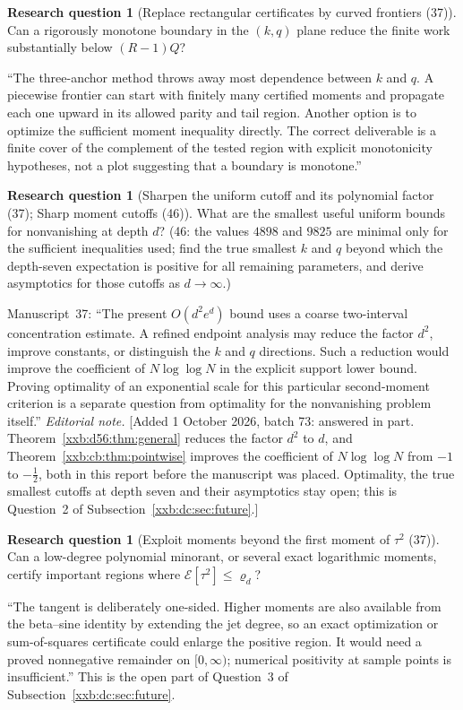 \documentclass[11pt,a4paper]{article}
\numberwithin{equation}{section}
\theoremstyle{definition}
\newtheorem{question}[theorem]{Research question}
\theoremstyle{remark}
\theoremstyle{plain}
\begin{document}
\begin{question}[Replace rectangular certificates by curved frontiers (37)]\label{xxb:d78:q:frontier}
Can a rigorously monotone boundary in the $(k,q)$ plane reduce the finite work
substantially below $(R-1)Q$?
\end{question}
``The three-anchor method throws away most dependence between $k$ and $q$.  A
piecewise frontier can start with finitely many certified moments and propagate
each one upward in its allowed parity and tail region. Another option is to
optimize the sufficient moment inequality directly. The correct deliverable is
a finite cover of the complement of the tested region with explicit
monotonicity hypotheses, not a plot suggesting that a boundary is monotone.''

\begin{question}[Sharpen the uniform cutoff and its polynomial factor (37); Sharp moment cutoffs (46)]\label{xxb:d78:q:cutoff}
What are the smallest useful uniform bounds for nonvanishing at depth $d$?
(46: the values $4898$ and $9825$ are minimal only for the sufficient
inequalities used; find the true smallest $k$ and $q$ beyond which the
depth-seven expectation is positive for all remaining parameters, and derive
asymptotics for those cutoffs as $d\to\infty$.)
\end{question}
Manuscript~37: ``The present $O(d^2e^d)$ bound uses a coarse two-interval
concentration estimate. A refined endpoint analysis may reduce the factor
$d^2$, improve constants, or distinguish the $k$ and $q$ directions. Such a
reduction would improve the coefficient of $N\log\log N$ in the explicit
support lower bound. Proving optimality of an exponential scale for this
particular second-moment criterion is a separate question from optimality for
the nonvanishing problem itself.''
\emph{Editorial note.}  [Added 1 October 2026, batch 73: answered in part.
Theorem~\ref{xxb:d56:thm:general} reduces the factor $d^2$ to $d$, and
Theorem~\ref{xxb:cb:thm:pointwise} improves the coefficient of $N\log\log N$
from $-1$ to $-\frac12$, both in this report before the manuscript was placed.
Optimality, the true smallest cutoffs at depth seven and their asymptotics stay
open; this is Question~2 of Subsection~\ref{xxb:dc:sec:future}.]

\begin{question}[Exploit moments beyond the first moment of $\tau^2$ (37)]\label{xxb:d78:q:moments}
Can a low-degree polynomial minorant, or several exact logarithmic moments,
certify important regions where $\mathcal E[\tau^2]\le\varrho_d$?
\end{question}
``The tangent is deliberately one-sided. Higher moments are also available from
the beta--sine identity by extending the jet degree, so an exact optimization
or sum-of-squares certificate could enlarge the positive region. It would need
a proved nonnegative remainder on $[0,\infty)$; numerical positivity at sample
points is insufficient.''  This is the open part of Question~3 of
Subsection~\ref{xxb:dc:sec:future}.
\end{document}
